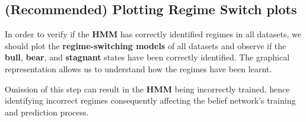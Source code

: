 \documentclass[11pt]{report}
\begin{document}
    \hypertarget{recommended-plotting-regime-switch-plots}{%
\subsection{(Recommended) Plotting Regime Switch
plots}\label{recommended-plotting-regime-switch-plots}}

In order to verify if the \textbf{HMM} has correctly identified regimes
in all datasets, we should plot the \textbf{regime-switching models} of
all datasets and observe if the \textbf{bull}, \textbf{bear}, and
\textbf{stagnant} states have been correctly identified. The graphical
representation allows us to understand how the regimes have been learnt.

Omission of this step can result in the \textbf{HMM} being incorrectly
trained, hence identifying incorrect regimes consequently affecting the
belief network's training and prediction process.
\end{document}
